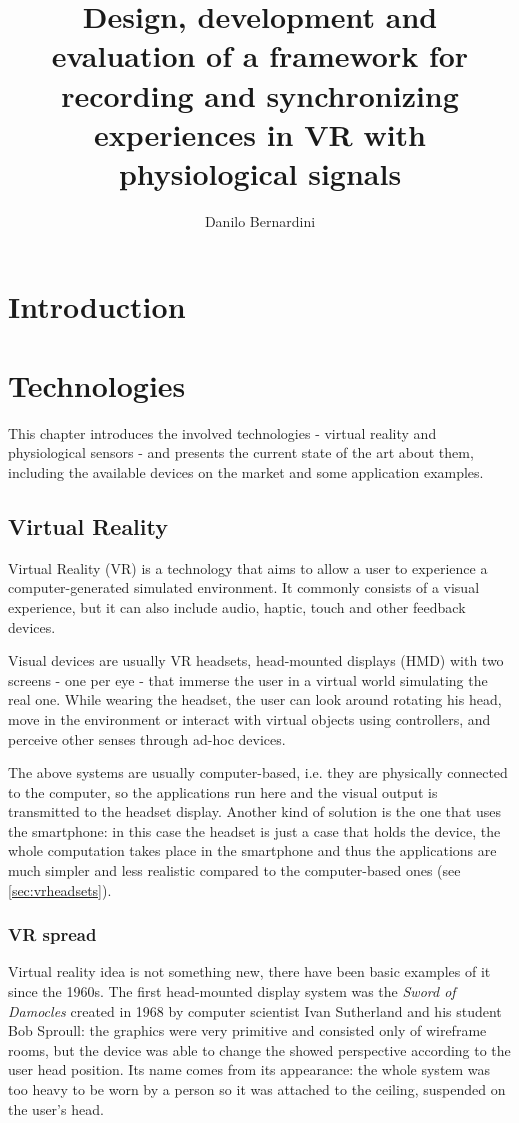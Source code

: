 \documentclass[binding=0.6cm,LaM]{sapthesis}
\title{Design, development and evaluation of a framework for recording and synchronizing experiences in VR with physiological signals}
\author{Danilo Bernardini}
\begin{document}
\frontmatter
\maketitle
\tableofcontents
\mainmatter
\chapter{Introduction}

\chapter{Technologies}

This chapter introduces the involved technologies - virtual reality and physiological sensors -  and presents the current state of the art about them, including the available devices on the market and some application examples.

\section{Virtual Reality}
Virtual Reality (VR) is a technology that aims to allow a user to experience a computer-generated simulated environment. It commonly consists of a visual experience, but it can also include audio, haptic, touch and other feedback devices. 

Visual devices are usually VR headsets, head-mounted displays (HMD) with two screens - one per eye - that immerse the user in a virtual world simulating the real one. While wearing the headset, the user can look around rotating his head, move in the environment or interact with virtual objects using controllers, and perceive other senses through ad-hoc devices.

The above systems are usually computer-based, i.e. they are physically connected to the computer, so the applications run here and the visual output is transmitted to the headset display.
Another kind of solution is the one that uses the smartphone: in this case the headset is just a case that holds the device, the whole computation takes place in the smartphone and thus the applications are much simpler and less realistic compared to the computer-based ones (see \ref{sec:vrheadsets}).
	
\subsection{VR spread}
Virtual reality idea is not something new, there have been basic examples of it since the 1960s. The first head-mounted display system was the \textit{Sword of Damocles} \cite{sutherland1968head} created in 1968 by computer scientist Ivan Sutherland and his student Bob Sproull: the graphics were very primitive and consisted only of wireframe rooms, but the device was able to change the showed perspective according to the user head position. Its name comes from its appearance: the whole system was too heavy to be worn by a person so it was attached to the ceiling, suspended on the user's head.
\end{document}
